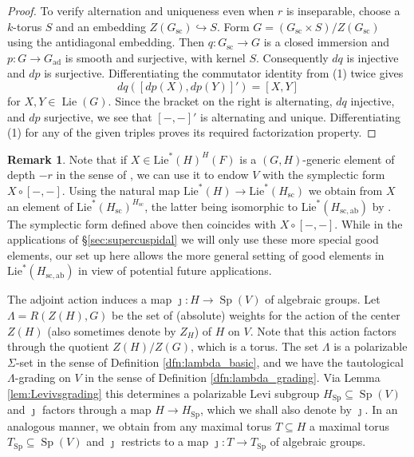 \documentclass{article}
\DeclareMathOperator{\Sp}{Sp}
\theoremstyle{definition}
\newtheorem{rem}[thm]{Remark}
\numberwithin{equation}{subsection}
\renewcommand{\-}{\hyp{}}
\begin{document}
\begin{proof}
	To verify alternation and uniqueness even when $r$ is inseparable, choose a $k$-torus $S$ and an embedding $Z(G_{\mathrm{sc}})\hookrightarrow S$. Form $G=(G_{\mathrm{sc}}\times S)/Z(G_{\mathrm{sc}})$ using the antidiagonal embedding. Then $q:G_{\mathrm{sc}}\to G$ is a closed immersion and $p:G\to G_{\mathrm{ad}}$ is smooth and surjective, with kernel $S$. Consequently $dq$ is injective and $dp$ is surjective. Differentiating the commutator identity from (1) twice gives
	 \[ dq([dp(X),dp(Y)]')=[X,Y] \]
	for $X,Y\in\operatorname{Lie}(G)$. Since the bracket on the right is alternating, $dq$ injective, and $dp$ surjective, we see that $[-,-]'$ is alternating and unique. Differentiating (1) for any of the given triples proves its required factorization property.
\end{proof}



  
  \begin{rem}
	Note that if $X \in \mathrm{Lie}^*(H)^H(F)$ is a $(G,H)$-generic element of depth $-r$ in the sense of \cite[Definition~4.1.1]{FS25}, we can use it to endow $V$ with the symplectic form $X \circ [-,-]$. Using the natural map $\mathrm{Lie}^*(H) \to \mathrm{Lie}^*(H_\mathrm{sc})$ we obtain from $X$ an element of $\mathrm{Lie}^*(H_{\mathrm{sc}})^{H_{\mathrm{sc}}}$, the latter being isomorphic to $\mathrm{Lie}^*(H_\mathrm{sc,ab})$ by \cite[Lemma~4.1.5]{FKS23}. The symplectic form defined above then coincides with $X \circ [-,-]$. While in the applications of \S\ref{sec:supercuspidal} we will only use these more special good elements, our set up here allows the more general setting of good elements in $\mathrm{Lie}^*(H_\mathrm{sc,ab})$ in view of potential future applications.
  \end{rem}

	The adjoint action induces a map $\jmath : H \to \Sp(V)$ of algebraic groups. Let $\Lambda=R(Z(H),G)$ be the set of (absolute) weights for the action of the center $Z(H)$ (also sometimes denote by $Z_H$)
of $H$ on $V$. Note that this action factors through the quotient $Z(H)/Z(G)$, which is a torus. The set $\Lambda$ is a polarizable $\Sigma$-set in the sense of Definition \ref{dfn:lambda_basic}, and we have the tautological $\Lambda$-grading on $V$ in the sense of Definition \ref{dfn:lambda_grading}. Via Lemma \ref{lem:Levivsgrading} this determines a polarizable Levi subgroup $H_{\Sp} \subseteq \Sp(V)$ and $\jmath$ factors through a map $H \to H_{\Sp}$, which we shall also denote by $\jmath$. In an analogous manner, we obtain from any maximal torus $T \subseteq H$ a maximal torus $T_{\Sp} \subseteq \Sp(V)$ and $\jmath$ restricts to a map $\jmath : T \to T_{\Sp}$ of algebraic groups.
\end{document}
